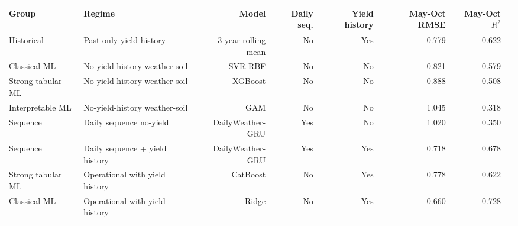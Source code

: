 \begin{tabular}{llrrrrrr}
\toprule
Group & Regime & Model & Daily seq. & Yield history & May-Oct RMSE & May-Oct $R^2$ \\
\midrule
Historical & Past-only yield history & 3-year rolling mean & No & Yes & 0.779 & 0.622 \\
Classical ML & No-yield-history weather-soil & SVR-RBF & No & No & 0.821 & 0.579 \\
Strong tabular ML & No-yield-history weather-soil & XGBoost & No & No & 0.888 & 0.508 \\
Interpretable ML & No-yield-history weather-soil & GAM & No & No & 1.045 & 0.318 \\
Sequence & Daily sequence no-yield & DailyWeather-GRU & Yes & No & 1.020 & 0.350 \\
Sequence & Daily sequence + yield history & DailyWeather-GRU & Yes & Yes & 0.718 & 0.678 \\
Strong tabular ML & Operational with yield history & CatBoost & No & Yes & 0.778 & 0.622 \\
Classical ML & Operational with yield history & Ridge & No & Yes & 0.660 & 0.728 \\
\bottomrule
\end{tabular}
